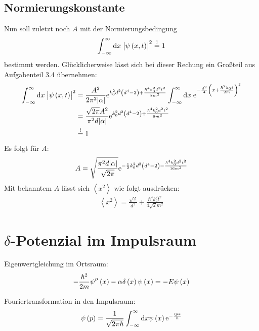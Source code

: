 \subsection{Normierungskonstante}
Nun soll zuletzt noch $A$ mit der Normierungsbedingung 
\[
	\int_{-\infty}^{\infty}\dif x\;\abs{\psi\del{x,t}}^2\overset{!}{=}1
\]
bestimmt werden. Glücklicherweise lässt sich bei dieser Rechung ein Großteil aus Aufgabenteil 3.4 übernehmen:
\begin{align*}
	\int_{-\infty}^{\infty}\dif x\;\abs{\psi\del{x,t}}^2&=\frac{A^2}{2\pi^2\abs{\alpha}}\ee^{k_0^2d^2\del{d^4-2}+\frac{\hbar^4k_0^2d^2t^2}{8m^2}}
	\int_{-\infty}^{\infty}\dif x\;\ee^{-\frac{d^2}{4}\del{x+\frac{\hbar^2k_0t}{2m}}^2}\\
	&=\frac{\sqrt{2\pi}A^2}{\pi^2d\abs{\alpha}}\ee^{k_0^2d^2\del{d^4-2}+\frac{\hbar^4k_0^2d^2t^2}{8m^2}}\\
	&\overset{!}{=}1
\end{align*}
Es folgt für $A$:
\begin{align*}
	A=\sqrt{\frac{\pi^2d\abs{\alpha}}{\sqrt{2\pi}}}\ee^{-\half k_0^2d^2\del{d^4-2}-\frac{\hbar^4k_0^2d^2t^2}{16m^2}}
\end{align*}
Mit bekanntem $A$ lässt sich $\left<x^2\right>$ wie folgt ausdrücken:
\begin{align*}
	\left<x^2\right>=\frac{\sqrt{2}}{d^2}+\frac{\hbar^4k_0^2t^2}{4\sqrt{2}m^2}
\end{align*}


\section{$\delta$-Potenzial im Impulsraum}
Eigenwertgleichung im Ortsraum:
\begin{align*}
 - \frac{\hbar^2}{2m}\psi''\del{x} -\alpha\delta\del{x}\psi\del{x} = -E \psi\del{x}
\end{align*}

Fouriertransformation in den Impulsraum:
\begin{align*}
 \psi\del{p} = \frac{1}{\sqrt{2\pi\hbar}}\int^\infty_{-\infty} \dif x \psi\del{x} \ee^{- \frac{\ii p x}{\hbar}}
\end{align*}




